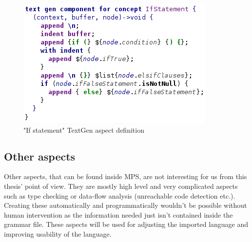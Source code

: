 \begin{figure}[h]
	\centering
	\includegraphics[scale=0.70]{./img/if_statement_textgen.png}
	\caption{"If statement" TextGen aspect definition}
	\label{fig:if_statement_textgen}
\end{figure}

\subsection{Other aspects}
Other aspects, that can be found inside MPS, are not interesting for us from this thesis' point of view.
They are mostly high level and very complicated aspects such as type checking or data-flow analysis (unreachable code detection etc.).
Creating these automatically and programmatically wouldn't be possible without human intervention as the information needed just isn't contained inside the grammar file.
These aspects will be used for adjusting the imported language and improving usability of the language.